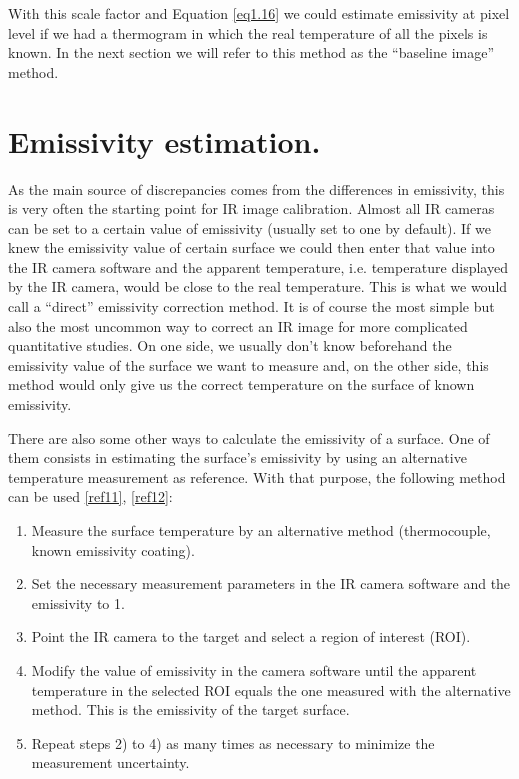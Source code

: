 		With this scale factor and Equation \ref{eq1.16} we could estimate emissivity at pixel level if we had a thermogram in which the real temperature of all the pixels is known. In the next section we will refer to this method as the “baseline image” method.\bigskip
		
	\section{Emissivity estimation. }\label{section3.3}
		
		As the main source of discrepancies comes from the differences in emissivity, this is very often the starting point for IR image calibration. Almost all IR cameras can be set to a certain value of emissivity (usually set to one by default). If we knew the emissivity value of certain surface we could then enter that value into the IR camera software and the apparent temperature, i.e. temperature displayed by the IR camera, would be close to the real temperature. This is what we would call a “direct” emissivity correction method. It is of course the most simple but also the most uncommon way to correct an IR image for more complicated quantitative studies. On one side, we usually don’t know beforehand the emissivity value of the surface we want to measure and, on the other side, this method would only give us the correct temperature on the surface of known emissivity.
		
		There are also some other ways to calculate the emissivity of a surface. One of them consists in estimating the surface’s emissivity by using an alternative temperature measurement as reference. With that purpose, the following method can be used  \ref{ref11}, \ref{ref12}:
		
		\begin{enumerate}[label={\arabic*)}]
			\item Measure the surface temperature by an alternative method (thermocouple, known emissivity coating).
			\item Set the necessary measurement parameters in the IR camera software and the emissivity to 1.
			\item Point the IR camera to the target and select a region of interest (ROI).
			\item Modify the value of emissivity in the camera software until the apparent temperature in the selected ROI equals the one measured with the alternative method. This is the emissivity of the target surface.
			\item Repeat steps 2) to 4) as many times as necessary to minimize the measurement uncertainty.
		\end{enumerate}
	
